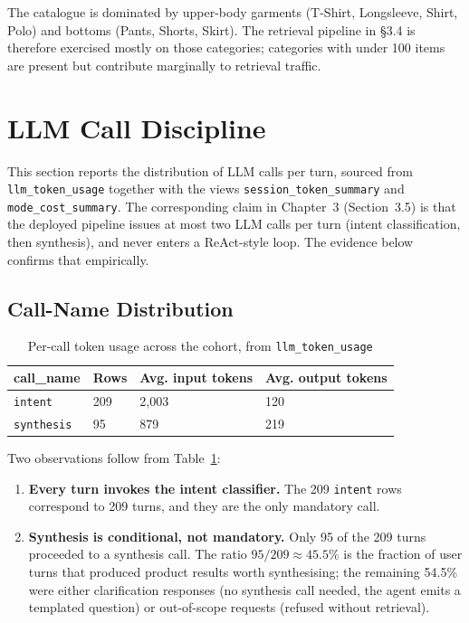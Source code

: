The catalogue is dominated by upper-body garments (T-Shirt, Longsleeve, Shirt, Polo) and bottoms (Pants, Shorts, Skirt). The retrieval pipeline in §3.4 is therefore exercised mostly on those categories; categories with under 100 items are present but contribute marginally to retrieval traffic.




\section{LLM Call Discipline}
\label{sec:llm_call_discipline}

This section reports the distribution of LLM calls per turn, sourced from \texttt{llm\_token\_usage} together with the views \texttt{session\_token\_summary} and \texttt{mode\_cost\_summary}. The corresponding claim in Chapter~3 (Section~3.5) is that the deployed pipeline issues at most two LLM calls per turn (intent classification, then synthesis), and never enters a ReAct-style loop. The evidence below confirms that empirically.

\subsection{Call-Name Distribution}
\label{subsec:call_name_distribution}

\begin{table}[H]
\centering
\begin{tabular}{p{3cm}p{2.5cm}p{3.5cm}p{3.5cm}}
\toprule
\textbf{call\_name} & \textbf{Rows} & \textbf{Avg. input tokens} & \textbf{Avg. output tokens}\\
\midrule
\texttt{intent}    & 209 & 2{,}003 & 120\\
\texttt{synthesis} & 95  & 879     & 219\\
\bottomrule
\end{tabular}
\caption{Per-call token usage across the cohort, from \texttt{llm\_token\_usage}}
\label{tab:call_name_distribution}
\end{table}

Two observations follow from Table~\ref{tab:call_name_distribution}:

\begin{enumerate}
    \item \textbf{Every turn invokes the intent classifier.} The 209 \texttt{intent} rows correspond to 209 turns, and they are the only mandatory call.
    \item \textbf{Synthesis is conditional, not mandatory.} Only 95 of the 209 turns proceeded to a synthesis call. The ratio $95/209 \approx 45.5\%$ is the fraction of user turns that produced product results worth synthesising; the remaining 54.5\% were either clarification responses (no synthesis call needed, the agent emits a templated question) or out-of-scope requests (refused without retrieval).
\end{enumerate}

